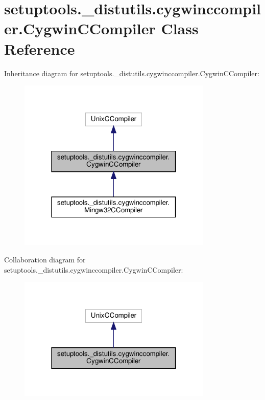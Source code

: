 \hypertarget{classsetuptools_1_1__distutils_1_1cygwinccompiler_1_1CygwinCCompiler}{}\section{setuptools.\+\_\+distutils.\+cygwinccompiler.\+Cygwin\+C\+Compiler Class Reference}
\label{classsetuptools_1_1__distutils_1_1cygwinccompiler_1_1CygwinCCompiler}


Inheritance diagram for setuptools.\+\_\+distutils.\+cygwinccompiler.\+Cygwin\+C\+Compiler\+:
\nopagebreak
\begin{figure}[H]
\begin{center}
\leavevmode
\includegraphics[width=262pt]{classsetuptools_1_1__distutils_1_1cygwinccompiler_1_1CygwinCCompiler__inherit__graph}
\end{center}
\end{figure}


Collaboration diagram for setuptools.\+\_\+distutils.\+cygwinccompiler.\+Cygwin\+C\+Compiler\+:
\nopagebreak
\begin{figure}[H]
\begin{center}
\leavevmode
\includegraphics[width=262pt]{classsetuptools_1_1__distutils_1_1cygwinccompiler_1_1CygwinCCompiler__coll__graph}
\end{center}
\end{figure}
